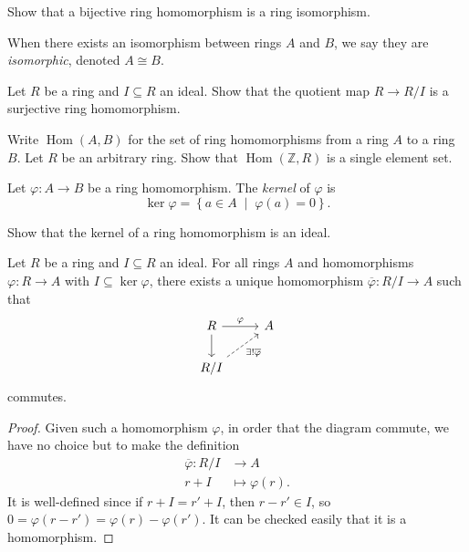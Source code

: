 \documentclass[a4paper,11pt]{article}
\begin{document}
    \begin{exercise}
      Show that a bijective ring homomorphism is a ring isomorphism.
    \end{exercise}

    When there exists an isomorphism between rings \(A\) and \(B\), we say they are \emph{isomorphic}, denoted \(A \cong B\).

    \begin{exercise}
      Let \(R\) be a ring and \(I \subseteq R\) an ideal. Show that the quotient map \(R \to R/I\) is a surjective ring homomorphism.
    \end{exercise}

    \begin{exercise}
      Write \(\operatorname{Hom}(A,B)\) for the set of ring homomorphisms from a ring \(A\) to a ring \(B\). Let \(R\) be an arbitrary ring. Show that \(\operatorname{Hom}(\mathbb{Z}, R)\) is a single element set.
    \end{exercise}

    \begin{definition}
      Let \(\varphi: A \to B\) be a ring homomorphism. The \emph{kernel} of \(\varphi\) is
      \[
        \ker \varphi = \left\{ a \in A \; \middle| \; \varphi(a) = 0 \right\}.
      \]
    \end{definition}

    \begin{exercise}
      Show that the kernel of a ring homomorphism is an ideal.
    \end{exercise}

    \begin{proposition}
      Let \(R\) be a ring and \(I \subseteq R\) an ideal. For all rings \(A\) and homomorphisms \(\varphi: R \to A\) with \(I \subseteq \ker \varphi\), there exists a unique homomorphism \(\overline{\varphi}: R/I \to A\) such that
      \[
        \begin{tikzcd}
          R \arrow[d,] \arrow[r,"\varphi"] & A \\
          R/I \arrow[ru,"\exists!\overline{\varphi}"',dashed] & {}
        \end{tikzcd}
      \]
      commutes.
    \end{proposition}
    \begin{proof}
      Given such a homomorphism \(\varphi\), in order that the diagram commute, we have no choice but to make the definition
      \begin{align*}
        \overline{\varphi}: R/I &\to A \\
        r + I &\mapsto \varphi(r).
      \end{align*}
      It is well-defined since if \(r + I = r' + I\), then \(r - r' \in I\), so \(0 = \varphi(r - r') = \varphi(r) - \varphi(r')\). It can be checked easily that it is a homomorphism.
    \end{proof}
\end{document}
